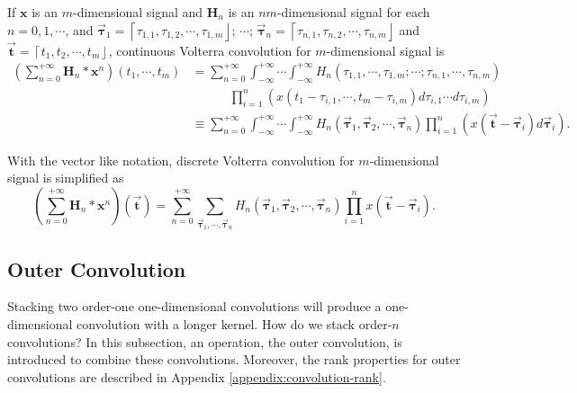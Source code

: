 \documentclass[twoside,11pt]{article}
\def\tvar#1{\mathbf{#1}} %
\def\vsymb#1{\vec{\mathbf{#1}}}
\def\isintinf{\int_{-\infty}^{+\infty}\!\!\!\cdots\!\int_{-\infty}^{+\infty}\!}
\def\lcerfl#1{\left\lceil{#1}\right\rfloor}
\begin{document}
If \(\tvar{x}\) is an \(m\)-dimensional signal and \(\tvar{H}_n\) is an \(nm\)-dimensional signal for each \(n=0, 1, \cdots\), and \(\vsymb{\tau}_1 = \lcerfl{\tau_{1,1}, \tau_{1,2}, \cdots, \tau_{1,m}}\); \(\cdots\); \(\vsymb{\tau}_n = \lcerfl{\tau_{n,1}, \tau_{n,2}, \cdots, \tau_{n,m}}\) and \(\vsymb{t} = \lcerfl{t_1, t_2, \cdots, t_m}\), continuous Volterra convolution for \(m\)-dimensional signal is
\begin{equation}
  \begin{aligned}
    \left(
    \sum_{n=0}^{+\infty} \tvar{H}_n * \tvar{x}^n
    \right)(t_1, \cdots, t_m)
     & = \sum_{n=0}^{+\infty} \isintinf H_n(\tau_{1,1}, \cdots, \tau_{1,m}; \cdots ; \tau_{n,1}, \cdots, \tau_{n,m}) \\
     & \qquad\quad
    \prod_{i=1}^{n} \left(
    x(t_1 - \tau_{i,1}, \cdots, t_m - \tau_{i,m}) d \tau_{i,1} \cdots d \tau_{i,m}
    \right)                                                                                                          \\
     & \equiv \sum_{n=0}^{+\infty} \isintinf
    H_n(\vsymb{\tau}_1, \vsymb{\tau}_2, \cdots, \vsymb{\tau}_n)
    \prod_{i=1}^{n} \left( x(\vsymb{t} - \vsymb{\tau}_i) d \vsymb{\tau}_i \right).
  \end{aligned}
  \label{equ:def-continuous-volterra-convolution-md}
\end{equation}

With the vector like notation, discrete Volterra convolution for \(m\)-dimensional signal is simplified as
\begin{equation}
  \left( \sum_{n=0}^{+\infty} \tvar{H}_n * \tvar{x}^n \right)(\vsymb{t})
  = \sum_{n=0}^{+\infty} \sum_{\vsymb{\tau}_1, \cdots, \vsymb{\tau}_n}
  H_n(\vsymb{\tau}_1, \vsymb{\tau}_2, \cdots, \vsymb{\tau}_n) \prod_{i=1}^{n} x(\vsymb{t} - \vsymb{\tau}_i).
  \label{equ:def-discrete-volterra-convolution-md}
\end{equation}


\subsection{Outer Convolution}
\label{subsec:outer-convolution}

Stacking two order-one one-dimensional convolutions will produce a one-dimensional convolution with a longer kernel. How do we stack order-\(n\) convolutions?
In this subsection, an operation, the outer convolution, is introduced to combine these convolutions. Moreover, the rank properties for outer convolutions are described in Appendix \ref{appendix:convolution-rank}.
\end{document}
